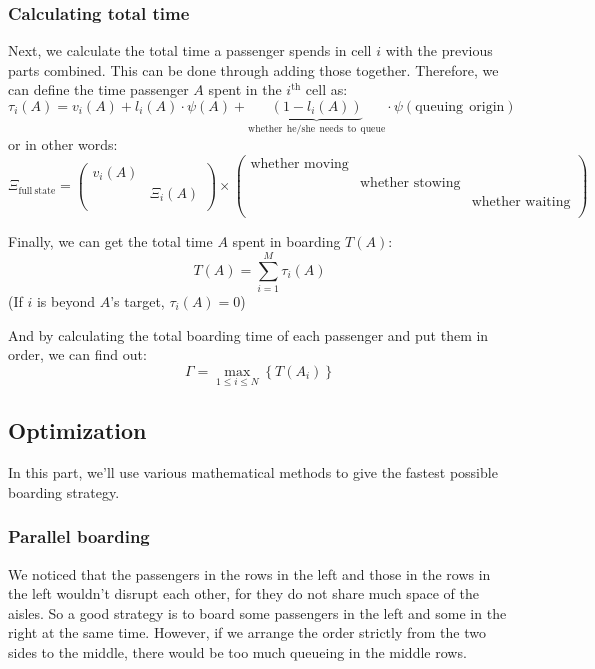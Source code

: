\documentclass{article}
\begin{document}
	\subsubsection{Calculating total time}
	Next, we calculate the total time a passenger spends in cell \(i\) with the previous parts combined. This can be done through adding those together. Therefore, we can define the time passenger $A$ spent in the $i^\text{th}$ cell as:
	$$\tau _i\left( A \right) =v_i\left( A \right) +l_i\left( A \right) \cdot \psi \left( A \right) +\underset{\mathrm{whether}\:\:\mathrm{he}/\mathrm{she}\:\:\mathrm{needs}\:\:\mathrm{to}\:\:\mathrm{queue}}{\underbrace{\left( 1-l_i\left( A \right) \right) }}\cdot \psi \left( \mathrm{queuing}\:\:\mathrm{origin} \right)$$
	or in other words:
	\[\Xi _{\mathrm{full}\:\mathrm{state}}=\left( \begin{matrix}
	v_i\left( A \right)&		\\
	&		\Xi _i\left( A \right)\\
	\end{matrix} \right) \times \left( \begin{matrix}
	\text{whether moving}&		&		\\
	&		\text{whether stowing}&		\\
	&		&		\text{whether waiting}\\
	\end{matrix} \right) \]

	Finally, we can get the total time $A$ spent in boarding $T(A)$:
	$$T\left( A \right) =\sum_{i=1}^M{\tau _i\left( A \right)}$$
	(If $i$ is beyond \(A\)'s target, $\tau_i(A)=0$)

	And by calculating the total boarding time of each passenger and put them in order, we can find out:
	$$\Gamma =\max_{1\le i\le N} \left\{ T\left( A_i \right) \right\}$$
	\subsection{Optimization}
	In this part, we'll use various mathematical methods to give the fastest possible boarding strategy.
	\subsubsection{Parallel boarding}
	We noticed that the passengers in the rows in the left and those in the rows in the left wouldn't disrupt each other, for they do not share much space of the aisles. So a good strategy is to board some passengers in the left and some in the right at the same time. However, if we arrange the order strictly from the two sides to the middle, there would be too much queueing in the middle rows.
\end{document}
